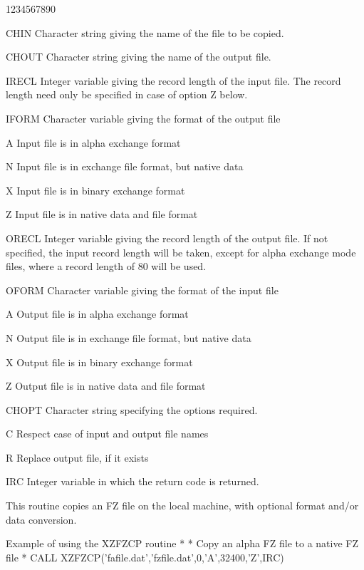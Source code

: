 \begin{DLtt}{1234567890}
\item[CHIN]Character string giving the name of the file
to be copied.
\item[CHOUT]Character string giving the name of the output
file.
\item[IRECL]Integer variable giving the record length of the
input file. The record length need only be specified in case
of option Z below.
\item[IFORM]Character variable giving the format of the output file
\begin{DLtt}{12}
\item[A]Input file is in alpha exchange format
\item[N]Input file is in exchange file format, but native data
\item[X]Input file is in binary exchange format
\item[Z]Input file is in native data and file format
\end{DLtt}
\item[ORECL]Integer variable giving the record length of the
output file. If not specified, the input record length will
be taken, except for alpha exchange mode files, where a record
length of 80 will be used.
\item[OFORM]Character variable giving the format of the input file
\begin{DLtt}{12}
\item[A]Output file is in alpha exchange format
\item[N]Output file is in exchange file format, but native data
\item[X]Output file is in binary exchange format
\item[Z]Output file is in native data and file format
\end{DLtt}
\item[CHOPT]Character string specifying the options required.
\begin{DLtt}{12}
\item[C]Respect case of input and output file names
\item[R]Replace output file, if it exists
\end{DLtt}
\item[IRC]Integer variable in which the return code is returned.
\end{DLtt}
This routine copies an FZ file on the local machine, with
optional format and/or data conversion.
\begin{XMPt}{Example of using the XZFZCP routine}
*
*     Copy an alpha FZ file to a native FZ file
*
      CALL XZFZCP('fafile.dat','fzfile.dat',0,'A',32400,'Z',IRC)
\end{XMPt}
